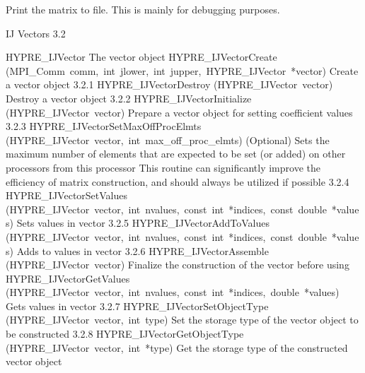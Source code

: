 \documentclass{article}
\begin{document}
\begin{cxxentry}
\begin{cxxentry}
\begin{cxxfunction}
\begin{cxxdoc}
Print the matrix to file.  This is mainly for debugging purposes.
\end{cxxdoc}
\end{cxxfunction}
\end{cxxentry}
\begin{cxxentry}
{}
        {IJ Vectors}
        {}
        {
}
        {3.2}
\begin{cxxnames}
        {HYPRE\_IJVector}
        {}
        {
The vector object}
        {}
\label{cxx.3.2.12}
        {HYPRE\_IJVectorCreate}
        {(MPI\_Comm\ comm,\ int\ jlower,\ int\ jupper,\ HYPRE\_IJVector\ *vector)}
        {
Create a vector object}
        {3.2.1}
        {HYPRE\_IJVectorDestroy}
        {(HYPRE\_IJVector\ vector)}
        {
Destroy a vector object}
        {3.2.2}
        {HYPRE\_IJVectorInitialize}
        {(HYPRE\_IJVector\ vector)}
        {
Prepare a vector object for setting coefficient values}
        {3.2.3}
        {HYPRE\_IJVectorSetMaxOffProcElmts}
        {(HYPRE\_IJVector\ vector,\ int\ max\_off\_proc\_elmts)}
        {
(Optional) Sets the maximum number of elements that are expected to be set
(or added) on other processors from this processor
This routine can significantly improve the efficiency of matrix
construction, and should always be utilized if possible}
        {3.2.4}
        {HYPRE\_IJVectorSetValues}
        {(HYPRE\_IJVector\ vector,\ int\ nvalues,\ const\ int\ *indices,\ const\ double\ *values)}
        {
Sets values in vector}
        {3.2.5}
        {HYPRE\_IJVectorAddToValues}
        {(HYPRE\_IJVector\ vector,\ int\ nvalues,\ const\ int\ *indices,\ const\ double\ *values)}
        {
Adds to values in vector}
        {3.2.6}
        {HYPRE\_IJVectorAssemble}
        {(HYPRE\_IJVector\ vector)}
        {
Finalize the construction of the vector before using}
        {}
\label{cxx.3.2.13}
        {HYPRE\_IJVectorGetValues}
        {(HYPRE\_IJVector\ vector,\ int\ nvalues,\ const\ int\ *indices,\ double\ *values)}
        {
Gets values in vector}
        {3.2.7}
        {HYPRE\_IJVectorSetObjectType}
        {(HYPRE\_IJVector\ vector,\ int\ type)}
        {
Set the storage type of the vector object to be constructed}
        {3.2.8}
        {HYPRE\_IJVectorGetObjectType}
        {(HYPRE\_IJVector\ vector,\ int\ *type)}
        {
Get the storage type of the constructed vector object}
        {}
\label{cxx.3.2.14}

\end{cxxnames}
\end{cxxentry}
\end{cxxentry}
\end{document}
